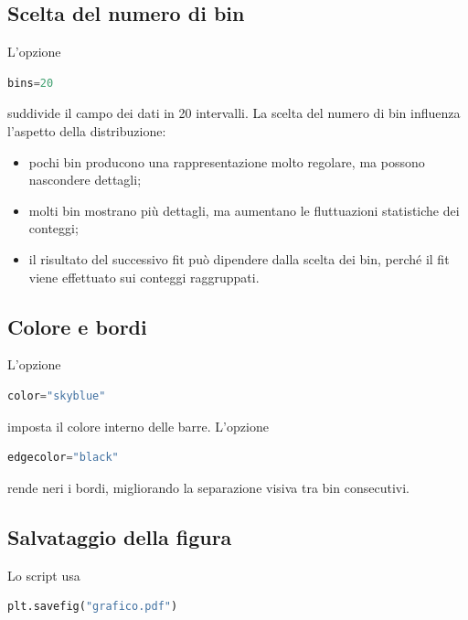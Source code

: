 \subsection{Scelta del numero di bin}

L'opzione

\begin{lstlisting}[language=Python]
bins=20
\end{lstlisting}

suddivide il campo dei dati in 20 intervalli. La scelta del numero di bin
influenza l'aspetto della distribuzione:

\begin{itemize}
    \item pochi bin producono una rappresentazione molto regolare, ma
          possono nascondere dettagli;
    \item molti bin mostrano più dettagli, ma aumentano le fluttuazioni
          statistiche dei conteggi;
    \item il risultato del successivo fit può dipendere dalla scelta dei
          bin, perché il fit viene effettuato sui conteggi raggruppati.
\end{itemize}

\subsection{Colore e bordi}

L'opzione

\begin{lstlisting}[language=Python]
color="skyblue"
\end{lstlisting}

imposta il colore interno delle barre. L'opzione

\begin{lstlisting}[language=Python]
edgecolor="black"
\end{lstlisting}

rende neri i bordi, migliorando la separazione visiva tra bin
consecutivi.

\subsection{Salvataggio della figura}

Lo script usa

\begin{lstlisting}[language=Python]
plt.savefig("grafico.pdf")
\end{lstlisting}

